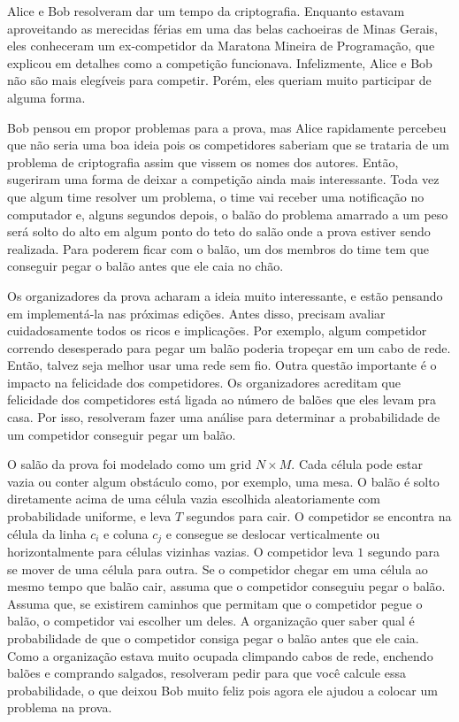 Alice e Bob resolveram dar um tempo da criptografia.
Enquanto estavam aproveitando as merecidas férias em uma das belas cachoeiras de Minas Gerais, eles
conheceram um ex-competidor da Maratona Mineira de Programação, que explicou em detalhes como a competição funcionava.
Infelizmente, Alice e Bob não são mais elegíveis para competir. Porém, eles queriam muito participar de alguma forma.

Bob pensou em propor problemas para a prova, mas Alice rapidamente percebeu que não seria uma boa ideia pois os competidores
saberiam que se trataria de um problema de criptografia assim que vissem os nomes dos autores. Então, sugeriram uma forma
de deixar a competição ainda mais interessante. Toda vez que algum time resolver um problema, o time vai receber uma notificação
no computador e, alguns segundos depois, o balão do problema amarrado a um peso será solto do alto em algum ponto do teto do salão
onde a prova estiver sendo realizada. Para poderem ficar com o balão, um dos membros do time tem que conseguir pegar o balão antes
que ele caia no chão. 

Os organizadores da prova acharam a ideia muito interessante, e estão pensando em implementá-la nas próximas edições.
Antes disso, precisam avaliar cuidadosamente todos os ricos e implicações. Por exemplo, algum competidor correndo desesperado
para pegar um balão poderia tropeçar em um cabo de rede. Então, talvez seja melhor usar uma rede sem fio. Outra questão importante
é o impacto na felicidade dos competidores. Os organizadores acreditam que felicidade dos competidores está ligada ao número de
balões que eles levam pra casa. Por isso, resolveram fazer uma análise para determinar a probabilidade de um competidor conseguir
pegar um balão.

O salão da prova foi modelado como um grid $N \times M$. Cada célula pode estar vazia ou conter algum obstáculo como, por exemplo, uma mesa.
O balão é solto diretamente acima de uma célula vazia escolhida aleatoriamente com probabilidade uniforme, e leva $T$ segundos para cair. 
O competidor se encontra na célula da linha $c_i$ e coluna $c_j$ e consegue se deslocar verticalmente ou horizontalmente para células vizinhas
vazias. O competidor leva $1$ segundo para se mover de uma célula para outra. 
Se o competidor chegar em uma célula ao mesmo tempo que balão cair, assuma que o competidor conseguiu pegar o balão.
Assuma que, se existirem caminhos que permitam que o competidor pegue o balão, o competidor vai escolher um deles.
A organização quer saber qual é probabilidade de que o competidor consiga pegar o balão antes que ele caia. Como a
organização estava muito ocupada climpando cabos de rede, enchendo balões e comprando salgados, resolveram pedir para que você calcule essa probabilidade, o que deixou Bob muito feliz pois agora ele ajudou a colocar um problema na prova.


